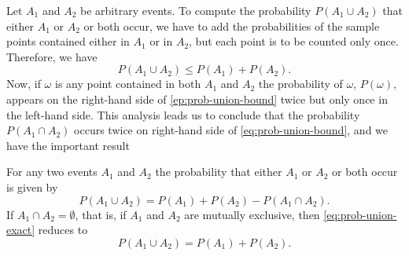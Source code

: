 Let \(A_1\) and \(A_2\) be arbitrary events. To compute the probability
\(P(A_1\cup A_2)\) that either \(A_1\) or \(A_2\) or both occur, we have to
add the probabilities of the sample points contained either in \(A_1\) or
in \(A_2\), but each point is to be counted only once. Therefore, we have
\begin{equation}
  \label{eq:prob-union-bound}
  P(A_1\cup A_2)\leq P(A_1)+P(A_2).
\end{equation}
Now, if \(\omega\) is any point contained in both \(A_1\) and \(A_2\) the
probability of \(\omega\), \(P(\omega)\), appears on the right-hand side of
\eqref{ep:prob-union-bound} twice but only once in the left-hand side. This
analysis leads us to conclude that the probability \(P(A_1\cap A_2)\)
occurs twice on right-hand side of \eqref{eq:prob-union-bound}, and we have
the important result
\begin{theorem}
  For any two events \(A_1\) and \(A_2\) the probability that either
  \(A_1\) or \(A_2\) or both occur is given by
  \begin{equation}
    \label{eq:prob-union-exact}
    P(A_1\cup A_2)=P(A_1)+P(A_2)-P(A_1\cap A_2).
  \end{equation}
  If \(A_1\cap A_2=\emptyset\), that is, if \(A_1\) and \(A_2\) are
  mutually exclusive, then \eqref{eq:prob-union-exact} reduces to
  \[
    P(A_1\cup A_2)=P(A_1)+P(A_2).
  \]
\end{theorem}

